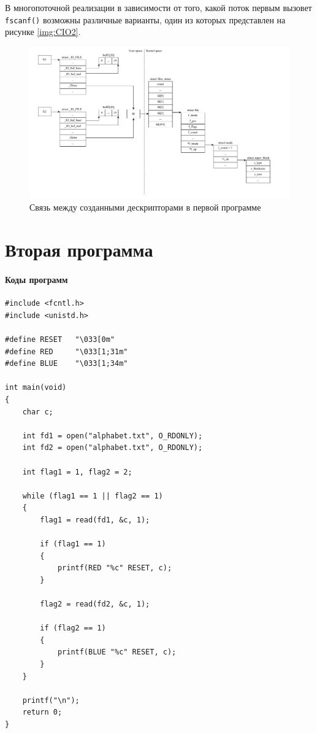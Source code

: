 В многопоточной реализации в зависимости от того, какой поток первым вызовет \texttt{fscanf()} возможны различные варианты, один из которых представлен на рисунке \ref{img:CIO2}.

\begin{figure}[H]
	\begin{center}
		\includegraphics[scale=0.6]{img/CIO.pdf}
	\end{center}
	\captionsetup{justification=centering}
	\caption{Связь между созданными дескрипторами в первой программе}
	\label{img:CIO}
\end{figure}

\chapter{Вторая программа}

\subsubsection{Коды программ}

\begin{center}
    \captionsetup{justification=raggedright,singlelinecheck=off}
    \begin{lstlisting}[label=lst:kernelIO1,caption=Один поток]
#include <fcntl.h>
#include <unistd.h>

#define RESET   "\033[0m"
#define RED     "\033[1;31m"
#define BLUE    "\033[1;34m"

int main(void)
{
    char c;    

    int fd1 = open("alphabet.txt", O_RDONLY);
    int fd2 = open("alphabet.txt", O_RDONLY);

    int flag1 = 1, flag2 = 2;

    while (flag1 == 1 || flag2 == 1)
    {
        flag1 = read(fd1, &c, 1);

        if (flag1 == 1)
        {
            printf(RED "%c" RESET, c);
        }

        flag2 = read(fd2, &c, 1);

        if (flag2 == 1)
        {
            printf(BLUE "%c" RESET, c);
        }
    }

    printf("\n");
    return 0;
}
\end{lstlisting}
\end{center}

